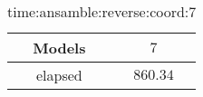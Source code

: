 \begin{table}[!ht]
	\centering
	\begin{tabular}{|c|c|}
		\hline
		Models & $7$ \\ \hline
		elapsed & $860.34$ \\ \hline
	\end{tabular}
	\caption{time:ansamble:reverse:coord:7}
	\label{tab:time:ansamble:reverse:coord:7}
\end{table}
